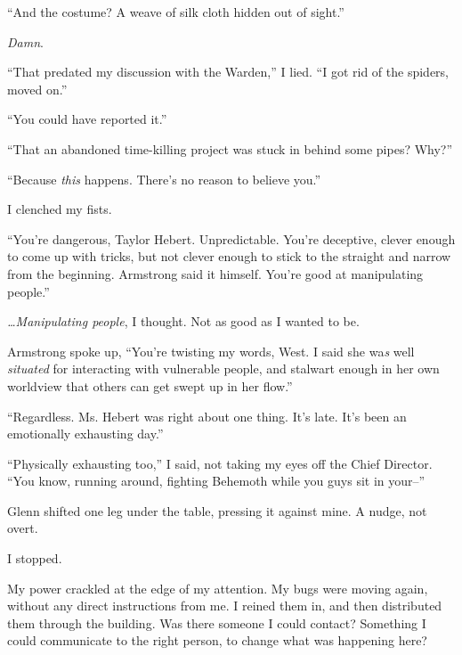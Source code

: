 ``And the costume?  A weave of silk cloth hidden out of sight.''



\emph{Damn}.



``That predated my discussion with the Warden,'' I lied.  ``I got rid of the spiders, moved on.''



``You could have reported it.''



``That an abandoned time-killing project was stuck in behind some pipes?  Why?''



``Because \emph{this} happens.  There's no reason to believe you.''



I clenched my fists.



``You're dangerous, Taylor Hebert.  Unpredictable.  You're deceptive, clever enough to come up with tricks, but not clever enough to stick to the straight and narrow from the beginning.  Armstrong said it himself.  You're good at manipulating people.''



\emph{\ldots{}Manipulating people}, I thought.  Not as good as I wanted to be.



Armstrong spoke up, ``You're twisting my words, West.  I said she wa\emph{s }well\emph{ situated }for interacting with vulnerable people, and stalwart enough in her own worldview that others can get swept up in her flow.''



``Regardless.  Ms. Hebert was right about one thing.  It's late.  It's been an emotionally exhausting day.''



``Physically exhausting too,'' I said, not taking my eyes off the Chief Director.  ``You know, running around, fighting Behemoth while you guys sit in your--''



Glenn shifted one leg under the table, pressing it against mine.  A nudge, not overt.



I stopped.



My power crackled at the edge of my attention.  My bugs were moving again, without any direct instructions from me.  I reined them in, and then distributed them through the building.  Was there someone I could contact?  Something I could communicate to the right person, to change what was happening here?



